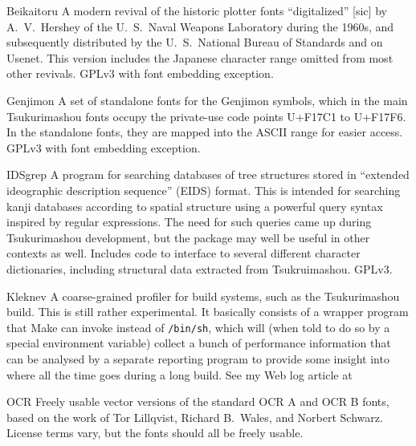 \documentclass[14pt]{extarticle}
\begin{document}
\begin{description}
  \item{Beikaitoru} A modern revival of the historic plotter fonts
    ``digitalized'' [sic] by A.\ V.\ Hershey of the U.\ S.\ Naval
    Weapons Laboratory during the 1960s, and subsequently distributed by the
    U.\ S.\ National Bureau of Standards and on Usenet.  This version
    includes the Japanese character range omitted from most other revivals.
    GPLv3 with font embedding exception.

  \item{Genjimon} A set of standalone fonts for the Genjimon symbols, which
    in the main Tsukurimashou fonts occupy the private-use code points
    U+F17C1 to U+F17F6.  In the standalone fonts, they are mapped into the
    ASCII range for easier access.  GPLv3 with font embedding exception.

  \item{IDSgrep} A program for searching databases of tree structures stored
    in ``extended ideographic description sequence'' (EIDS) format.  This is
    intended for searching kanji databases according to spatial structure
    using a powerful query syntax inspired by regular expressions.  The need
    for such queries came up during Tsukurimashou development, but the
    package may well be useful in other contexts as well.  Includes code to
    interface to several different character dictionaries, including
    structural data extracted from Tsukruimashou.  GPLv3.

  \item{Kleknev} A coarse-grained profiler for build systems, such as the
    Tsukurimashou build.  This is still rather experimental.  It basically
    consists of a wrapper program that Make can invoke instead of
    \texttt{/bin/sh}, which will (when told to do so by a special
    environment variable) collect a bunch of performance information that
    can be analysed by a separate reporting program to provide some insight
    into where all the time goes during a long build.  See my Web log
    article at 

  \item{OCR} Freely usable vector versions of the standard OCR A and OCR B
    fonts, based on the work of Tor Lillqvist, Richard B.\ Wales, and
    Norbert Schwarz.  License terms vary, but the fonts should all be
    freely usable.
\end{description}

\end{document}

